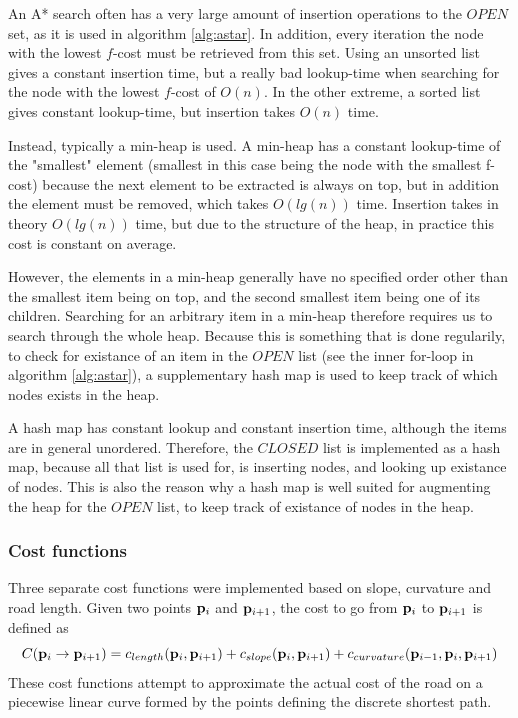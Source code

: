 An A* search often has a very large amount of insertion operations to the $OPEN$ set, as it is used in algorithm \ref{alg:astar}. In addition, every iteration the node with the lowest $f$-cost must be retrieved from this set. Using an unsorted list gives a constant insertion time, but a really bad lookup-time when searching for the node with the lowest $f$-cost of $O(n)$. In the other extreme, a sorted list gives constant lookup-time, but insertion takes $O(n)$ time. 

Instead, typically a min-heap is used. A min-heap has a constant lookup-time of the "smallest" element (smallest in this case being the node with the smallest f-cost) because the next element to be extracted is always on top, but in addition the element must be removed, which takes $O(lg(n))$ time. Insertion takes in theory $O(lg(n))$ time, but due to the structure of the heap, in practice this cost is constant on average. 

However, the elements in a min-heap generally have no specified order other than the smallest item being on top, and the second smallest item being one of its children. Searching for an arbitrary item in a min-heap therefore requires us to search through the whole heap. Because this is something that is done regularily, to check for existance of an item in the $OPEN$ list (see the inner for-loop in algorithm \ref{alg:astar}), a supplementary hash map is used to keep track of which nodes exists in the heap. 

A hash map has constant lookup and constant insertion time, although the items are in general unordered. Therefore, the $CLOSED$ list is implemented as a hash map, because all that list is used for, is inserting nodes, and looking up existance of nodes. This is also the reason why a hash map is well suited for augmenting the heap for the $OPEN$ list, to keep track of existance of nodes in the heap.

\subsubsection{Cost functions}
Three separate cost functions were implemented based on slope, curvature and road length. Given two points ${\mathbf p}_i$ and ${\mathbf p}_{i+1}$, the cost to go from ${\mathbf p}_i$ to ${\mathbf p}_{i+1}$ is defined as 
$$C({\mathbf p}_i \to {\mathbf p}_{i+1}) = c_{length}({\mathbf p}_i, {\mathbf p}_{i+1}) + c_{slope}({\mathbf p}_i, {\mathbf p}_{i+1}) + c_{curvature}({\mathbf p}_{i-1}, {\mathbf p}_i, {\mathbf p}_{i+1})$$
These cost functions attempt to approximate the actual cost of the road on a piecewise linear curve formed by the points defining the discrete shortest path. 

